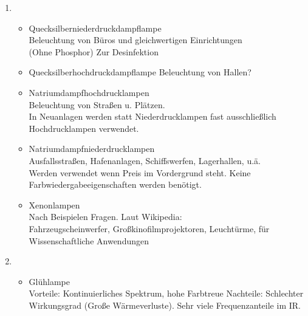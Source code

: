 \begin{enumerate}
            \clearpage
            
    \item   {}\\
    
            \begin{itemize}
                \item Quecksilberniederdruckdampflampe\\
                    Beleuchtung von Büros und gleichwertigen Einrichtungen\\
                    (Ohne Phosphor) Zur Desinfektion
                \item Quecksilberhochdruckdampflampe
                    Beleuchtung von Hallen?
                \item Natriumdampfhochdrucklampen\\
                    Beleuchtung von Straßen u. Plätzen. \\
                    In Neuanlagen werden statt Niederdrucklampen fast ausschließlich Hochdrucklampen verwendet.

                \item Natriumdampfniederdrucklampen\\
                    Ausfallsstraßen, Hafenanlagen, Schiffswerfen, Lagerhallen, u.ä.\\
                    Werden verwendet wenn Preis im Vordergrund steht. Keine Farbwiedergabeeigenschaften werden benötigt.

                \item Xenonlampen\\
                    Nach Beispielen Fragen. Laut Wikipedia:\\
                    Fahrzeugscheinwerfer, Großkinofilmprojektoren, Leuchtürme, für Wissenschaftliche Anwendungen
            \end{itemize}

    \item   {}\\
            
            \begin{itemize}
                \item Glühlampe\\
                    Vorteile: Kontinuierliches Spektrum, hohe Farbtreue
                    Nachteile: Schlechter Wirkungsgrad (Große Wärmeverluste). Sehr viele Frequenzanteile im IR.


\end{itemize}
\end{enumerate}
